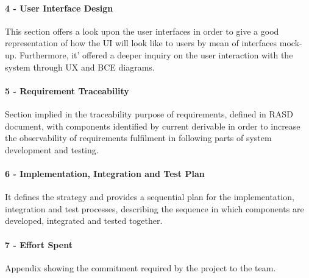 	\paragraph*{4 - User Interface Design}
	This section offers a look upon the user interfaces in order to give a good representation of how the UI will look like to users by mean of interfaces mock-up. Furthermore, it' offered a deeper inquiry on the user interaction with the system through UX and BCE diagrams.

	\paragraph*{5 - Requirement Traceability}
	Section implied in the traceability purpose of requirements, defined in RASD document, with components identified by current derivable in order to increase the observability of requirements fulfilment in following parts of system development and testing.

	\paragraph*{6 - Implementation, Integration and Test Plan} 
	It defines the strategy and provides a sequential plan for the implementation, integration and test processes, describing the sequence in which components are developed, integrated and tested together.

	\paragraph*{7 - Effort Spent}
	Appendix showing the commitment required by the project to the team.

